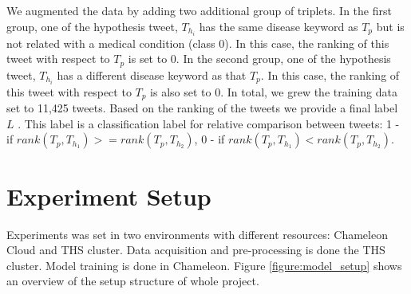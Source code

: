 \documentclass[12pt]{report}
\begin{document}
We  augmented the data  by adding two additional group of triplets.  In the first group, one of the 
hypothesis tweet, $T_{h_i}$ has the same disease keyword as $T_p$ but is not related with a medical condition (class 0). In this case, the 
ranking of this tweet with respect to $T_p$ is set to 0. In the second group, one of the 
hypothesis tweet, $T_{h_i}$ has a different disease keyword as that $T_p$.  In this case, the 
ranking of this tweet with respect to $T_p$ is also set to 0. In total, we grew the training data set to 11,425 tweets. 
Based on the ranking of the tweets we provide a final label $L$ . This label is a classification label for relative comparison between tweets: 1 - if $rank(T_p, T_{h_1}) >= rank(T_p, T_{h_2})$, 0 - if  $rank(T_p, T_{h_1}) < rank(T_p, T_{h_2})$.


\section{Experiment Setup}
Experiments was set in two environments with different resources: Chameleon Cloud and \ac{THS} cluster. Data acquisition and pre-processing is done
the \ac{THS} cluster. Model training is done in Chameleon. 
Figure \ref{figure:model_setup} shows an overview of the setup structure of whole project.
\end{document}
